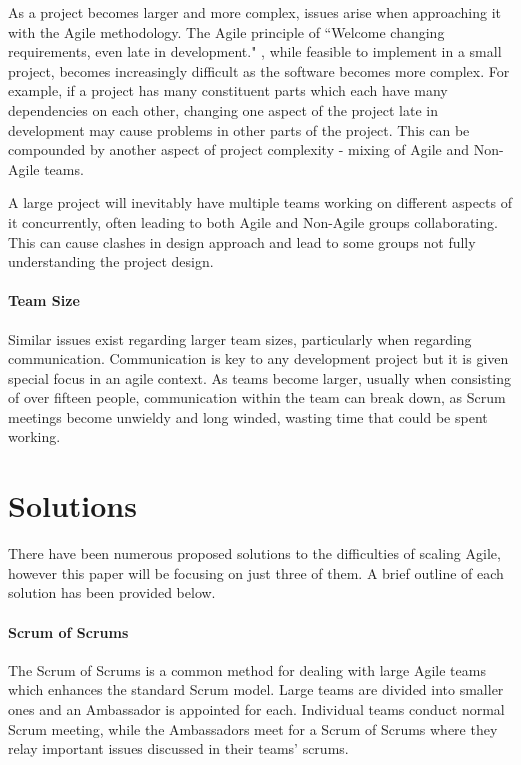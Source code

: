 \documentclass{scrartcl}
\begin{document}
As a project becomes larger and more complex, issues arise when approaching it with the Agile methodology. The Agile principle of ``Welcome changing requirements, even late in development." \cite{AgileManifesto}, while feasible to implement in a small project, becomes increasingly difficult as the software becomes more complex. For example, if a project has many constituent parts which each have many dependencies on each other, changing one aspect of the project late in development may cause problems in other parts of the project. This can be compounded by another aspect of project complexity - mixing of Agile and Non-Agile teams. \cite{reifer2003scaling}

A large project will inevitably have multiple teams working on different aspects of it concurrently, often leading to both Agile and Non-Agile groups collaborating. This can cause clashes in design approach and lead to some groups not fully understanding the project design. 

 

\paragraph{Team Size}\mbox{}\newline

Similar issues exist regarding larger team sizes, particularly when regarding communication. Communication is key to any development project but it is given special focus in an agile context. \cite{stoica2013software} As teams become larger, usually when consisting of over fifteen people, \cite{ambler2009agile} communication within the team can break down, as Scrum meetings become unwieldy and long winded, wasting time that could be spent working.

\section{Solutions}

There have been numerous proposed solutions to the difficulties of scaling Agile, however this paper will be focusing on just three of them. A brief outline of each solution has been provided below.

\paragraph{Scrum of Scrums}\mbox{}\newline

The Scrum of Scrums is a common method for dealing with large Agile teams which enhances the standard Scrum model. Large teams are divided into smaller ones and an Ambassador is appointed for each. Individual teams conduct normal Scrum meeting, while the Ambassadors meet for a Scrum of Scrums where they relay important issues discussed in their teams' scrums.
\end{document}
